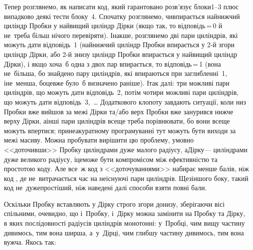 Тепер розглянемо, як написати код, який гарантовано розв'язує блоки\nolinebreak[2] \mbox{1--3} плюс випадково деякі тести блоку~4. Спочатку розглянемо, чи\nolinebreak[3] впирається найнижчий циліндр Пробки у найвищий циліндр Дірки (якщо так, то відповідь$\,$=$\,$0 й не~треба більш нічого перевіряти). Інакше, розглянемо дві пари циліндрів, які можуть дати відповідь~1 (найнижчий циліндр Пробки впирається у \mbox{2-й} згори циліндр Дірки, або \mbox{2-й} знизу циліндр Пробки впирається у найвищий циліндр Дірки), і якщо хоча~б одна з двох пар впирається, то відповідь$\,$=$\,$1 (вона не~більша, бо знайдено пару циліндрів, які впираються при заглибленні~1, і\nolinebreak[2] не~менша, бо\nolinebreak[2] це\nolinebreak[2] вже було~б визначено раніше). І\nolinebreak[3] так далі: три можливі пари циліндрів, що можуть дати відповідь~2, потім чотири можливі пари циліндрів, що можуть дати відповідь~3,~\dots{} Додаткового клопоту завдають ситуації, коли низ Пробки вже вийшов за межі Дірки та/або верх Пробки вже занурився нижче верху Дірки, а\nolinebreak[2] інші пари циліндрів все\nolinebreak[3] ще треба порівнювати, бо вони все\nolinebreak[3] ще можуть впертися; при\nolinebreak[3] неакуратному програмуванні тут можуть бути виходи за межі масиву. Можна пробувати вирішити цю проблему, умовно <<доточивши>> Пробку циліндрами дуже малого радіусу, а\nolinebreak[2] Дірку\nolinebreak[3] --- циліндрами дуже великого радіусу, і\nolinebreak[3] це\nolinebreak[3] може бути компромісом між ефективністю та простотою коду. Але все~ж код з <<доточуваннями>>  набирає менше балів, ніж код , де не~витрачається час на неіснуючі пари циліндрів. 
Ще\nolinebreak[3] з\nolinebreak[3] іншого боку, такий код не~дуже\nolinebreak[2] простіший, ніж наведені далі способи взяти повні бали.

Оскільки Пробку вставляють у Дірку строго згори донизу, зберігаючи вісі спільними, очевидно, що і~Пробку, і~Дірку можна замінити на Пробку та Дірку, в яких послідовності радіусів циліндрів монотонні: у~Пробці, чим вищу частину дивимось, тим вона ширша, а~у~Дірці, чим глибшу частину дивимось, тим вона вужча. Якось так:

\vspace{0pt plus 5mm}

